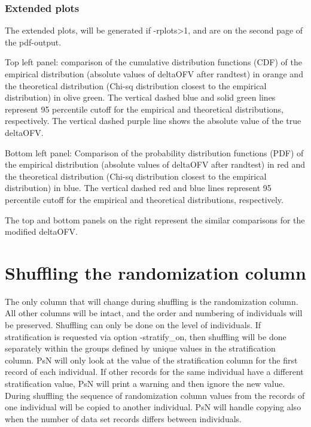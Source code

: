 \subsubsection*{Extended plots}
The extended plots, will be generated if -rplots>1, and are on the
second page of the pdf-output.

Top left panel: comparison of the cumulative distribution functions (CDF) 
of the empirical distribution (absolute values of deltaOFV after randtest) in 
orange and the theoretical distribution (Chi-sq distribution closest to the 
empirical distribution) in olive green. The vertical dashed blue and solid 
green lines represent 95 percentile cutoff for the empirical and theoretical 
distributions, respectively. The vertical dashed purple line shows the absolute
 value of the true deltaOFV.

Bottom left panel: Comparison of the probability distribution functions (PDF) 
of the empirical distribution (absolute values of deltaOFV after randtest) in 
red and the theoretical distribution (Chi-sq distribution closest to the 
empirical distribution) in blue. The vertical dashed red and blue lines 
represent 95 percentile cutoff for the empirical and theoretical distributions,
 respectively.

The top and bottom panels on the right represent the similar comparisons for 
the modified deltaOFV.

\section{Shuffling the randomization column}

The only column that will change during shuffling is the randomization column. All other columns will be intact, and the order and numbering of individuals will be preserved. Shuffling can only be done on the level of individuals. If stratification is requested via option -stratify\_on, then shuffling will be done separately within the groups defined by unique values in the stratification column. PsN will only look at the value of the stratification column for the first record of each individual. If other records for the same individual have a different stratification value, PsN will print a warning and then ignore the new value.
During shuffling the sequence of randomization column values from the records of one individual will be copied to another individual. PsN will handle copying also when the number of data set records differs between individuals.

